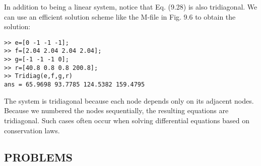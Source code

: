 \documentclass[../main.tex]{subfiles}
\begin{document}
In addition to being a linear system, notice that Eq. (9.28) is also tridiagonal. We can use an efficient solution scheme like the M-file in Fig. 9.6 to obtain the solution:
\begin{lstlisting}[numbers=none]
>> e=[0 -1 -1 -1];
>> f=[2.04 2.04 2.04 2.04];
>> g=[-1 -1 -1 0];
>> r=[40.8 0.8 0.8 200.8];
>> Tridiag(e,f,g,r)
ans = 65.9698 93.7785 124.5382 159.4795
\end{lstlisting}
The system is tridiagonal because each node depends only on its adjacent nodes.
Because we numbered the nodes sequentially, the resulting equations are tridiagonal. Such
cases often occur when solving differential equations based on conservation laws.


\pagebreak
\subsection*{PROBLEMS}
\end{document}
